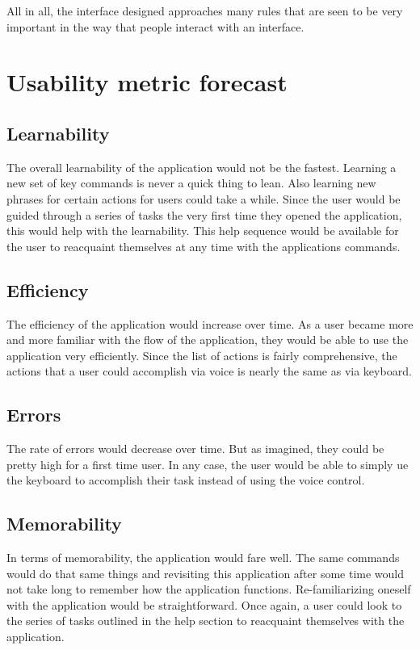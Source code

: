 \documentclass[11pt, oneside]{article}
\begin{document}
	All in all, the interface designed approaches many rules that are seen to be very important in the way that people interact with an interface.


\section{Usability metric forecast}

	\subsection{Learnability}
	The overall learnability of the application would not be the fastest. Learning a new set of key commands is never a quick thing to lean. Also learning new phrases for certain actions for users could take a while. Since the user would be guided through a series of tasks the very first time they opened the application, this would help with the learnability. This help sequence would be available for the user to reacquaint themselves at any time with the applications commands.

	\subsection{Efficiency}
	The efficiency of the application would increase over time. As a user became more and more familiar with the flow of the application, they would be able to use the application very efficiently. Since the list of actions is fairly comprehensive, the actions that a user could accomplish via voice is nearly the same as via keyboard.

	\subsection{Errors}
	The rate of errors would decrease over time. But as imagined, they could be pretty high for a first time user. In any case, the user would be able to simply ue the keyboard to accomplish their task instead of using the voice control.

	\subsection{Memorability}
	In terms of memorability, the application would fare well. The same commands would do that same things and revisiting this application after some time would not take long to remember how the application functions. Re-familiarizing oneself with the application would be straightforward. Once again, a user could look to the series of tasks outlined in the help section to reacquaint themselves with the application.
\end{document}
